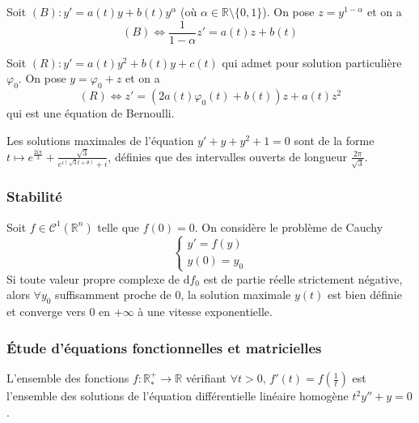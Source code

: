 
  \begin{application}
    Soit $(B) : y' = a(t) y + b(t) y^\alpha$ (où $\alpha \in \mathbb{R} \setminus \{0,1\}$). On pose $z=y^{1-\alpha}$ et on a
    \[ (B) \iff \frac{1}{1-\alpha} z' = a(t)z + b(t) \]
  \end{application}

  \begin{corollary}
    Soit $(R) : y' = a(t) y^2 + b(t) y + c(t)$ qui admet pour solution particulière $\varphi_0$. On pose $y = \varphi_0 + z$ et on a
    \[ (R) \iff z' = (2a(t) \varphi_0(t) + b(t))z + a(t)z^2 \]
    qui est une équation de Bernoulli.
  \end{corollary}

  \begin{example}
    Les solutions maximales de l'équation $y' + y + y^2 + 1 = 0$ sont de la forme $t \mapsto e^{\frac{2i\pi}{3}} + \frac{\sqrt{3}}{e^{i (\sqrt{3}t+\theta)} + i}$, définies que des intervalles ouverts de longueur $\frac{2 \pi}{\sqrt{3}}$.
  \end{example}

  \subsubsection{Stabilité}


  \begin{application}
    Soit $f \in \mathcal{C}^1(\mathbb{R}^n)$ telle que $f(0) = 0$. On considère le problème de Cauchy
    \[ \begin{cases} y'=f(y) \\ y(0) = y_0 \end{cases} \]
    Si toute valeur propre complexe de $\mathrm{d}f_0$ est de partie réelle strictement négative, alors $\forall y_0$ suffisamment proche de $0$, la solution maximale $y(t)$ est bien définie et converge vers $0$ en $+ \infty$ à une vitesse exponentielle.
  \end{application}

  \subsubsection{Étude d'équations fonctionnelles et matricielles}


  \begin{application}
    L'ensemble des fonctions $f : \mathbb{R}^+_* \rightarrow \mathbb{R}$ vérifiant $\forall t > 0, \, f'(t) = f \left( \frac{1}{t} \right)$ est l'ensemble des solutions de l'équation différentielle linéaire homogène $t^2 y'' + y = 0$.
  \end{application}

